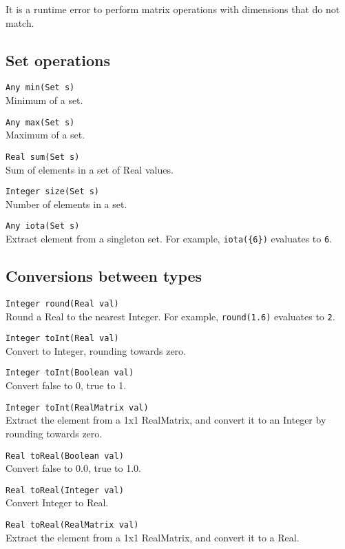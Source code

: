 It is a runtime error to perform matrix operations with dimensions that do not
match.


\subsection{Set operations}
\label{sec:builtin-set-ops}

\verb|Any min(Set s)| \\
Minimum of a set.

\verb|Any max(Set s)| \\
Maximum of a set.

\verb|Real sum(Set s)| \\
Sum of elements in a set of Real values.

\verb|Integer size(Set s)| \\
Number of elements in a set.

\verb|Any iota(Set s)| \\
Extract element from a singleton set.
For example, \verb|iota({6})| evaluates to \verb|6|.


\subsection{Conversions between types}
\label{sec:builtin-conversions}

\verb|Integer round(Real val)| \\
Round a Real to the nearest Integer.
For example, \verb|round(1.6)| evaluates to \verb|2|.

\verb|Integer toInt(Real val)| \\
Convert to Integer, rounding towards zero.

\verb|Integer toInt(Boolean val)| \\
Convert false to 0, true to 1.

\verb|Integer toInt(RealMatrix val)| \\
Extract the element from a 1x1 RealMatrix, and convert it to an Integer by
rounding towards zero.

\verb|Real toReal(Boolean val)| \\
Convert false to 0.0, true to 1.0.

\verb|Real toReal(Integer val)| \\
Convert Integer to Real.

\verb|Real toReal(RealMatrix val)| \\
Extract the element from a 1x1 RealMatrix, and convert it to a Real.



